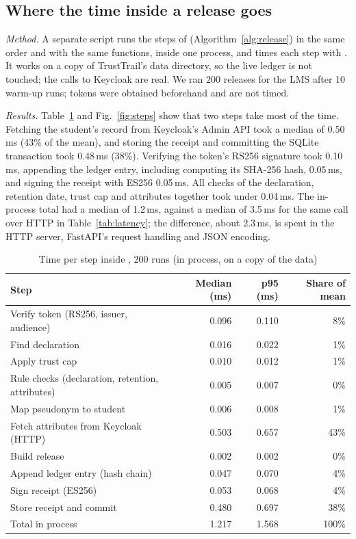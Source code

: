 \subsection{Where the time inside a release goes}
\label{sec:eval-steps}
\emph{Method.} A separate script runs the steps of  (Algorithm~\ref{alg:release}) in the same order and with the same functions, inside one process, and times each step with . It works on a copy of TrustTrail's data directory, so the live ledger is not touched; the calls to Keycloak are real. We ran 200 releases for the LMS after 10 warm-up runs; tokens were obtained beforehand and are not timed.

\emph{Results.} Table~\ref{tab:steps} and Fig.~\ref{fig:steps} show that two steps take most of the time. Fetching the student's record from Keycloak's Admin API took a median of 0.50\,ms (43\% of the mean), and storing the receipt and committing the SQLite transaction took 0.48\,ms (38\%). Verifying the token's RS256 signature took 0.10\,ms, appending the ledger entry, including computing its SHA-256 hash, 0.05\,ms, and signing the receipt with ES256 0.05\,ms. All checks of the declaration, retention date, trust cap and attributes together took under 0.04\,ms. The in-process total had a median of 1.2\,ms, against a median of 3.5\,ms for the same call over HTTP in Table~\ref{tab:latency}; the difference, about 2.3\,ms, is spent in the HTTP server, FastAPI's request handling and JSON encoding.

\begin{table}[t]
\centering
\caption{Time per step inside , 200 runs (in process, on a copy of the data)}
\label{tab:steps}
\small
\begin{tabular}{@{}lrrr@{}}
\toprule
Step & Median (ms) & p95 (ms) & Share of mean \\
\midrule
Verify token (RS256, issuer, audience) & 0.096 & 0.110 & 8\% \\
Find declaration & 0.016 & 0.022 & 1\% \\
Apply trust cap & 0.010 & 0.012 & 1\% \\
Rule checks (declaration, retention, attributes) & 0.005 & 0.007 & 0\% \\
Map pseudonym to student & 0.006 & 0.008 & 1\% \\
Fetch attributes from Keycloak (HTTP) & 0.503 & 0.657 & 43\% \\
Build release & 0.002 & 0.002 & 0\% \\
Append ledger entry (hash chain) & 0.047 & 0.070 & 4\% \\
Sign receipt (ES256) & 0.053 & 0.068 & 4\% \\
Store receipt and commit & 0.480 & 0.697 & 38\% \\
\midrule
Total in process & 1.217 & 1.568 & 100\% \\
\bottomrule
\end{tabular}
\end{table}

